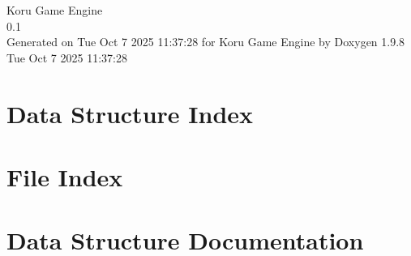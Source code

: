 \documentclass[twoside]{book}
\newcommand{\+}{\discretionary{\mbox{\scriptsize$\hookleftarrow$}}{}{}}
\newcommand{\clearemptydoublepage}{%
    \newpage{\pagestyle{empty}\cleardoublepage}%
  }
\begin{document}
  \raggedbottom
    \hypersetup{pageanchor=false,
                bookmarksnumbered=true,
                pdfencoding=unicode
               }
  \begin{titlepage}
  \vspace*{7cm}
  \begin{center}%
  {\Large Koru Game Engine}\\
  [1ex]\large 0.\+1 \\
  \vspace*{1cm}
  {\large Generated on Tue Oct 7 2025 11\+:37\+:28 for Koru Game Engine by Doxygen 1.9.8}\\
    \vspace*{0.5cm}
    {\small Tue Oct 7 2025 11:37:28}
  \end{center}
  \end{titlepage}
  \clearemptydoublepage
  \tableofcontents
  \clearemptydoublepage
  \hypersetup{pageanchor=true}

\chapter{Data Structure Index}

\chapter{File Index}

\chapter{Data Structure Documentation}














































\end{document}
